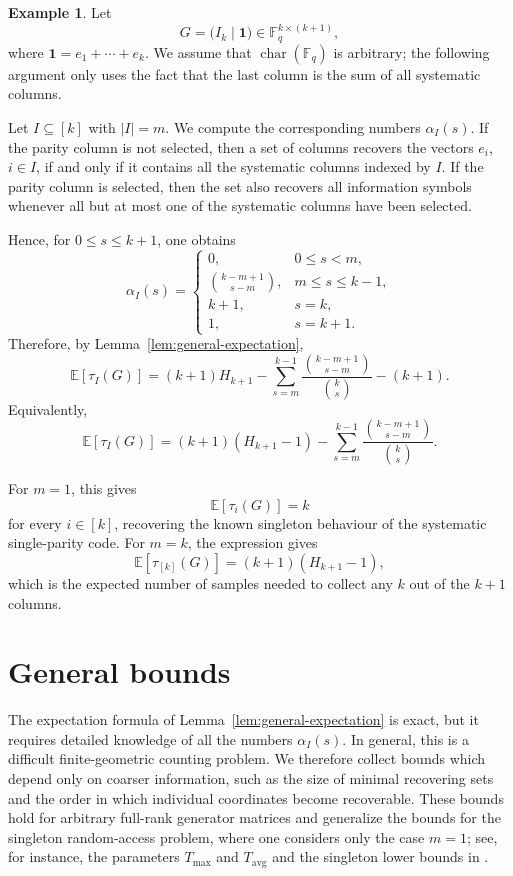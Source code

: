 \documentclass[11pt,a4paper]{article}
\numberwithin{equation}{section}
\theoremstyle{definition}
\newtheorem{example}[definition]{Example}
\theoremstyle{definition}
\newcommand{\F}{\mathbb{F}}
\newcommand{\E}{\mathbb{E}}
\newcommand{\Tmax}{T_{\max}}
\newcommand{\Tavg}{T_{\mathrm{avg}}}
\begin{document}
\begin{example}\label{ex:single-parity}
Let
\[
G=\bigl(I_k\mid \mathbf 1\bigr)\in \F_q^{k\times (k+1)},
\]
where $\mathbf 1=e_1+\cdots+e_k$.  We assume that
$\operatorname{char}(\F_q)$ is arbitrary; the following argument only uses
the fact that the last column is the sum of all systematic columns.

Let $I\subseteq[k]$ with $|I|=m$.  We compute the corresponding numbers
$\alpha_I(s)$.  If the parity column is not selected, then a set of columns
recovers the vectors $e_i$, $i\in I$, if and only if it contains all the
systematic columns indexed by $I$.  If the parity column is selected, then
the set also recovers all information symbols whenever all but at most one of
the systematic columns have been selected.

Hence, for $0\leq s\leq k+1$, one obtains
\[
\alpha_I(s)=
\begin{cases}
0, & 0\leq s<m,\\[2mm]
\binom{k-m+1}{s-m}, & m\leq s\leq k-1,\\[2mm]
k+1, & s=k,\\[2mm]
1, & s=k+1.
\end{cases}
\]
Therefore, by Lemma~\ref{lem:general-expectation},
\[
\E[\tau_I(G)]
=
(k+1)H_{k+1}
-
\sum_{s=m}^{k-1}
\frac{\binom{k-m+1}{s-m}}{\binom{k}{s}}
-
(k+1).
\]
Equivalently,
\[
\E[\tau_I(G)]
=
(k+1)(H_{k+1}-1)
-
\sum_{s=m}^{k-1}
\frac{\binom{k-m+1}{s-m}}{\binom{k}{s}}.
\]

For $m=1$, this gives
\[
\E[\tau_i(G)]=k
\]
for every $i\in[k]$, recovering the known singleton behaviour of the
systematic single-parity code.  For $m=k$, the expression gives
\[
\E[\tau_{[k]}(G)]
=
(k+1)(H_{k+1}-1),
\]
which is the expected number of samples needed to collect any $k$ out of the
$k+1$ columns.
\end{example}


\section{General bounds}\label{sec:bounds}

The expectation formula of Lemma~\ref{lem:general-expectation} is exact, but it requires detailed knowledge of all the numbers $\alpha_I(s)$.  In general, this is a difficult finite-geometric counting problem.  We therefore collect bounds which depend only on coarser information, such as the size of minimal recovering sets and the order in which individual coordinates become recoverable.  These bounds hold for arbitrary full-rank generator matrices and generalize the bounds for the singleton random-access problem, where one considers only the case $m=1$; see, for instance, the parameters $\Tmax$ and $\Tavg$ and the singleton lower bounds in \cite{bar2024cover}.
\end{document}
